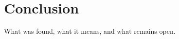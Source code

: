 \chapter{Conclusion}
\label{chap:conclusion}

What was found, what it means, and what remains open.
